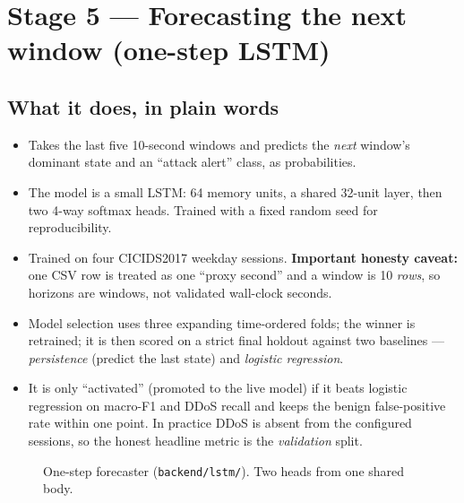 \documentclass[11pt,a4paper]{article}
\begin{document}
\section{Stage 5 --- Forecasting the next window (one-step LSTM)}

\subsection*{What it does, in plain words}
\begin{itemize}
\item Takes the last five 10-second windows and predicts the \emph{next}
  window's dominant state and an ``attack alert'' class, as probabilities.
\item The model is a small LSTM: 64 memory units, a shared 32-unit layer, then
  two 4-way softmax heads. Trained with a fixed random seed for reproducibility.
\item Trained on four CICIDS2017 weekday sessions. \textbf{Important honesty
  caveat:} one CSV row is treated as one ``proxy second'' and a window is
  10 \emph{rows}, so horizons are windows, not validated wall-clock seconds.
\item Model selection uses three expanding time-ordered folds; the winner is
  retrained; it is then scored on a strict final holdout against two baselines
  --- \emph{persistence} (predict the last state) and \emph{logistic
  regression}.
\item It is only ``activated'' (promoted to the live model) if it beats logistic
  regression on macro-F1 and DDoS recall and keeps the benign false-positive
  rate within one point. In practice DDoS is absent from the configured
  sessions, so the honest headline metric is the \emph{validation} split.
\end{itemize}

\begin{figure}[H]\centering
{}
\caption{One-step forecaster (\texttt{backend/lstm/}). Two heads from one shared
body.}
\end{figure}
\end{document}
